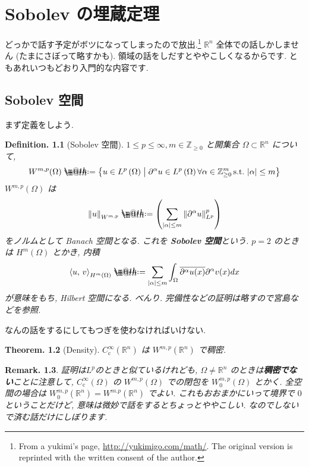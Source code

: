 \documentclass[openany, a4paper, oneside]{jsbook}
\makeatletter
\newcommand*{\defeq}{\mathrel{\rlap{%
\raisebox{0.3ex}{$\m@th\cdot$}}%
\raisebox{-0.3ex}{$\m@th\cdot$}}%
=}
\theoremstyle{break}
\newtheorem{thm}{Theorem.}[section]
\theoremstyle{breakdefn}
\newtheorem{defn}[thm]{Definition.}
\newtheorem{rem}[thm]{Remark.}
\newcommand{\abs}[1]{\left|#1\right|}
\newcommand{\norm}[1]{\left\Vert#1\right\Vert}
\newcommand{\rbk}[1]{\left (#1\right)}
\newcommand{\bkt}[2]{\left\langle#1,\,#2\right\rangle}
\newcommand{\relmiddle}[1]{\mathrel{}\middle#1\mathrel{}}
\newcommand{\set}[2]{\left\{#1 \relmiddle| #2\right\}}
\newcommand{\bbR}{\mathbb{R}}
\newcommand{\bbRn}{\mathbb{R}^n}
\newcommand{\bbZ}{\mathbb{Z}}
\newcommand{\Ccinfty}{C_{\mathrm{c}}^{\infty}}
\makeatother
\begin{document}
\chapter{Sobolev の埋蔵定理}


どっかで話す予定がボツになってしまったので放出.\footnote{From a yukimi's page, \href{http://yukimigo.com/math/}{http://yukimigo.com/math/}.
The original version is reprinted with the written consent of the author.
 }
$\mathbb{R}^n$ 全体での話しかしません (たまにさぼって略すかも).
領域の話をしだすとややこしくなるからです.
ともあれいつもどおり入門的な内容です.
\section{Sobolev 空間}


まず定義をしよう.
\begin{defn}[Sobolev 空間]
 $1 \le p \le \infty, m \in \bbZ_{\ge 0}$
 と開集合 $\Omega \subset \bbRn$ について,
 \begin{align}
  W^{m, p}(\Omega)
  \defeq
  \set{u \in L^p \rbk{\Omega}}{\partial^{\alpha} u \in L^p \rbk{\Omega} \forall \alpha \in \bbZ_{\geq 0}^{m}\, \text{s.t.} \, \abs{\alpha} \le m }
 \end{align}
 $W^{m, p}(\Omega)$ は
 \begin{align}
  \norm{u}_{W^{m,p}}
  \defeq
  \rbk{\sum_{\abs{\alpha} \le m} \norm{\partial^{\alpha} u}_{L^p}^p}
 \end{align}
 をノルムとして Banach 空間となる.
 これを \textbf{Sobolev 空間}という.
 $p = 2$ のときは $H^m (\Omega)$ とかき, 内積
 \begin{align}
  \bkt{u}{v}_{H^m \rbk{\Omega}}
  \defeq
  \sum_{\abs{\alpha} \leq m}
  \int_{\Omega} \overline{\partial^{\alpha}u (x)} \partial^{\alpha}v (x) dx
 \end{align}
 が意味をもち, Hilbert 空間になる.
 べんり.
 完備性などの証明は略すので宮島\cite{ShizuoMiyajima1}などを参照.
\end{defn}
なんの話をするにしてもつぎを使わなければいけない.
\begin{thm}[Density]
 $\Ccinfty(\bbRn)$ は $W^{m, p}(\bbR^n)$ で稠密.
\end{thm}
\begin{rem}
 証明は$L^p$のときと似ているけれども, $\Omega \neq \bbR^n$ のときは\textbf{稠密でない}ことに注意して,
 $\Ccinfty (\Omega)$ の $W^{m, p}(\Omega)$ での閉包を $W_0^{m, p}(\Omega)$ とかく.
 全空間の場合は $W_0^{m, p}(\mathbb{R}^n) = W^{m. p}(\mathbb{R}^n)$ でよい.
 これもおおまかにいって境界で $0$ ということだけど, 意味は微妙で話をするとちょっとややこしい.
 なのでしないで済む話だけにしぼります.
\end{rem}
\end{document}
